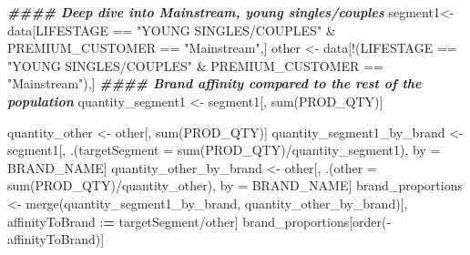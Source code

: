 \documentclass[
]{article}
\newenvironment{Shaded}{\begin{snugshade}}{\end{snugshade}}
\newcommand{\AttributeTok}[1]{\textcolor[rgb]{0.77,0.63,0.00}{#1}}
\newcommand{\DocumentationTok}[1]{\textcolor[rgb]{0.56,0.35,0.01}{\textbf{\textit{#1}}}}
\newcommand{\ErrorTok}[1]{\textcolor[rgb]{0.64,0.00,0.00}{\textbf{#1}}}
\newcommand{\FunctionTok}[1]{\textcolor[rgb]{0.00,0.00,0.00}{#1}}
\newcommand{\NormalTok}[1]{#1}
\newcommand{\OtherTok}[1]{\textcolor[rgb]{0.56,0.35,0.01}{#1}}
\newcommand{\SpecialCharTok}[1]{\textcolor[rgb]{0.00,0.00,0.00}{#1}}
\newcommand{\StringTok}[1]{\textcolor[rgb]{0.31,0.60,0.02}{#1}}
\begin{document}
\begin{Shaded}
\begin{Highlighting}[]
\DocumentationTok{\#\#\#\# Deep dive into Mainstream, young singles/couples}
\NormalTok{segment1}\OtherTok{\textless{}{-}}\NormalTok{ data[LIFESTAGE }\SpecialCharTok{==} \StringTok{"YOUNG SINGLES/COUPLES"} \SpecialCharTok{\&}\NormalTok{ PREMIUM\_CUSTOMER }\SpecialCharTok{==} \StringTok{"Mainstream"}\NormalTok{,]}
\NormalTok{other }\OtherTok{\textless{}{-}}\NormalTok{ data[}\SpecialCharTok{!}\NormalTok{(LIFESTAGE }\SpecialCharTok{==} \StringTok{"YOUNG SINGLES/COUPLES"} \SpecialCharTok{\&}\NormalTok{ PREMIUM\_CUSTOMER }\SpecialCharTok{==} \StringTok{"Mainstream"}\NormalTok{),]}
\DocumentationTok{\#\#\#\# Brand affinity compared to the rest of the population}
\NormalTok{quantity\_segment1 }\OtherTok{\textless{}{-}}\NormalTok{ segment1[, }\FunctionTok{sum}\NormalTok{(PROD\_QTY)]}

\NormalTok{quantity\_other }\OtherTok{\textless{}{-}}\NormalTok{ other[, }\FunctionTok{sum}\NormalTok{(PROD\_QTY)]}
\NormalTok{quantity\_segment1\_by\_brand }\OtherTok{\textless{}{-}}\NormalTok{ segment1[, .(}\AttributeTok{targetSegment =} \FunctionTok{sum}\NormalTok{(PROD\_QTY)}\SpecialCharTok{/}\NormalTok{quantity\_segment1), by }\OtherTok{=}\NormalTok{ BRAND\_NAME]}
\NormalTok{quantity\_other\_by\_brand }\OtherTok{\textless{}{-}}\NormalTok{ other[, .(}\AttributeTok{other =} \FunctionTok{sum}\NormalTok{(PROD\_QTY)}\SpecialCharTok{/}\NormalTok{quantity\_other), by }\OtherTok{=}\NormalTok{ BRAND\_NAME]}
\NormalTok{brand\_proportions }\OtherTok{\textless{}{-}} \FunctionTok{merge}\NormalTok{(quantity\_segment1\_by\_brand, quantity\_other\_by\_brand)[, affinityToBrand }\SpecialCharTok{:}\ErrorTok{=}\NormalTok{ targetSegment}\SpecialCharTok{/}\NormalTok{other]}
\NormalTok{brand\_proportions[}\FunctionTok{order}\NormalTok{(}\SpecialCharTok{{-}}\NormalTok{affinityToBrand)]}
\end{Highlighting}
\end{Shaded}
\end{document}
